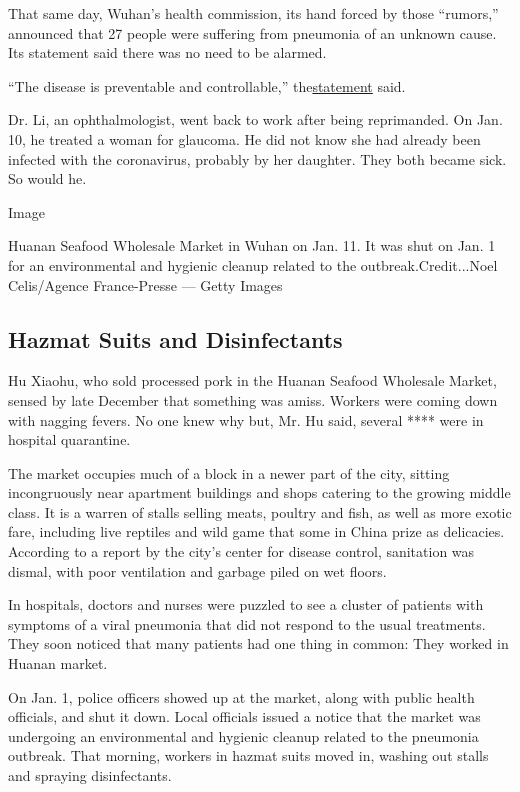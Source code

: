 That same day, Wuhan's health commission, its hand forced by those
``rumors,'' announced that 27 people were suffering from pneumonia of an
unknown cause. Its statement said there was no need to be alarmed.

``The disease is preventable and controllable,''
the\href{http://wjw.wuhan.gov.cn/front/web/showDetail/2019123108989}{statement}
said.

Dr. Li, an ophthalmologist, went back to work after being reprimanded.
On Jan. 10, he treated a woman for glaucoma. He did not know she had
already been infected with the coronavirus, probably by her daughter.
They both became sick. So would he.

Image

Huanan Seafood Wholesale Market in Wuhan on Jan. 11. It was shut on Jan.
1 for an environmental and hygienic cleanup related to the
outbreak.Credit...Noel Celis/Agence France-Presse --- Getty Images

\hypertarget{hazmat-suits-and-disinfectants}{%
\subsection{Hazmat Suits and
Disinfectants}\label{hazmat-suits-and-disinfectants}}

Hu Xiaohu, who sold processed pork in the Huanan Seafood Wholesale
Market, sensed by late December that something was amiss. Workers were
coming down with nagging fevers. No one knew why but, Mr. Hu said,
several **** were in hospital quarantine.

The market occupies much of a block in a newer part of the city, sitting
incongruously near apartment buildings and shops catering to the growing
middle class. It is a warren of stalls selling meats, poultry and fish,
as well as more exotic fare, including live reptiles and wild game that
some in China prize as delicacies. According to a report by the city's
center for disease control, sanitation was dismal, with poor ventilation
and garbage piled on wet floors.

In hospitals, doctors and nurses were puzzled to see a cluster of
patients with symptoms of a viral pneumonia that did not respond to the
usual treatments. They soon noticed that many patients had one thing in
common: They worked in Huanan market.

On Jan. 1, police officers showed up at the market, along with public
health officials, and shut it down. Local officials issued a notice that
the market was undergoing an environmental and hygienic cleanup related
to the pneumonia outbreak. That morning, workers in hazmat suits moved
in, washing out stalls and spraying disinfectants.

